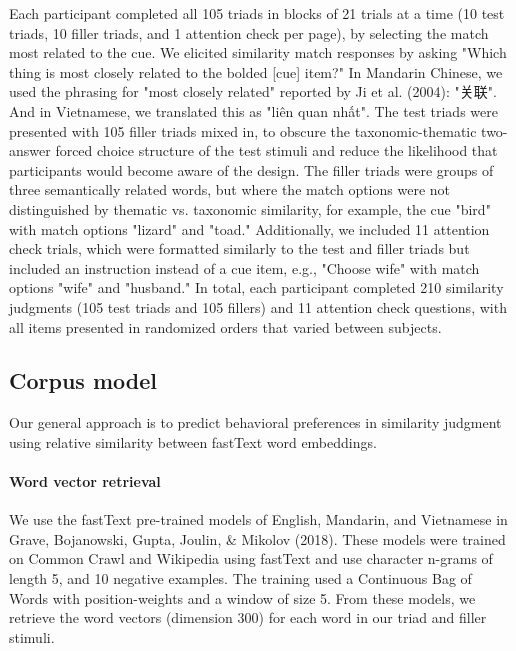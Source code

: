\documentclass[10pt, letterpaper]{article}
\begin{document}
\begin{CJK*}{UTF8}{gbsn}
Each participant completed all 105 triads in blocks of 21 trials at a time (10 test triads, 10 filler triads, and 1 attention check per page), by selecting the match most related to the cue. We elicited similarity match responses by asking "Which thing is most closely related to the bolded [cue] item?" In Mandarin Chinese, we used the phrasing for "most closely related" reported by Ji et al. (2004): "关联". And in Vietnamese, we translated this as "liên quan nhất".
The test triads were presented with 105 filler triads mixed in, to obscure the taxonomic-thematic two-answer forced choice structure of the test stimuli and reduce the likelihood that participants would become aware of the design.
The filler triads were groups of three semantically related words, but where the match options were not distinguished by thematic vs. taxonomic similarity, for example, the cue "bird" with match options "lizard" and "toad." Additionally, we included 11 attention check trials, which were formatted similarly to the test and filler triads but included an instruction instead of a cue item, e.g., "Choose wife" with match options "wife" and "husband." In total, each participant completed 210 similarity judgments (105 test triads and 105 fillers) and 11 attention check questions, with all items presented in randomized orders that varied between subjects.
\end{CJK*}

\hypertarget{corpus-model}{%
\subsection{Corpus model}\label{corpus-model}}

Our general approach is to predict behavioral preferences in similarity
judgment using relative similarity between fastText word embeddings.

\hypertarget{word-vector-retrieval}{%
\paragraph{Word vector retrieval}\label{word-vector-retrieval}}

We use the fastText pre-trained models of English, Mandarin, and
Vietnamese in Grave, Bojanowski, Gupta, Joulin, \& Mikolov (2018). These
models were trained on Common Crawl and Wikipedia using fastText and use
character n-grams of length 5, and 10 negative examples. The training
used a Continuous Bag of Words with position-weights and a window of
size 5. From these models, we retrieve the word vectors (dimension 300)
for each word in our triad and filler stimuli.
\end{document}
